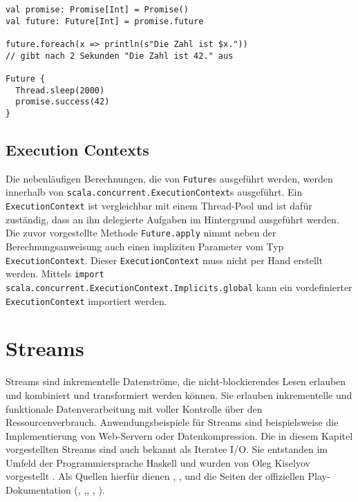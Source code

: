 \begin{lstlisting}[caption=Future-Erstellung mit einem Promise, label=lst:future_erstellung_mit_einem_promise]
val promise: Promise[Int] = Promise()
val future: Future[Int] = promise.future

future.foreach(x => println(s"Die Zahl ist $x."))
// gibt nach 2 Sekunden "Die Zahl ist 42." aus

Future {
  Thread.sleep(2000)
  promise.success(42)
}
\end{lstlisting}


\subsection{Execution Contexts} %
\label{sub:execution_contexts}

Die nebenläufigen Berechnungen, die von \lstinline|Future|s ausgeführt werden, werden innerhalb von \lstinline|scala.concurrent.ExecutionContext|s ausgeführt.
Ein \lstinline|ExecutionContext| ist vergleichbar mit einem Thread-Pool und ist dafür zuständig, dass an ihn delegierte Aufgaben im Hintergrund ausgeführt werden.
Die zuvor vorgestellte Methode \lstinline|Future.apply| nimmt neben der Berechnungsanweisung auch einen impliziten Parameter vom Typ \lstinline|ExecutionContext|.
Dieser \lstinline|ExecutionContext| muss nicht per Hand erstellt werden.
Mittels \lstinline|import scala.concurrent.ExecutionContext.Implicits.global| kann ein vordefinierter \lstinline|ExecutionContext| importiert werden.




\section{Streams} %
\label{sec:streams}

Streams sind inkrementelle Datenströme, die nicht-blockierendes Lesen erlauben und kombiniert und transformiert werden können.
Sie erlauben inkrementelle und funktionale Datenverarbeitung mit voller Kontrolle über den Ressourcenverbrauch.
Anwendungsbeispiele für Streams sind beispielsweise die Implementierung von Web-Servern oder Datenkompression.
Die in diesem Kapitel vorgestellten Streams sind auch bekannt als Iteratee I/O.
Sie entstanden im Umfeld der Programmiersprache Haskell und wurden von Oleg Kiselyov vorgestellt \cite[vgl.][S.~19]{monad_reader}.
Als Quellen hierfür dienen \citealt{kiselyov2012}, \citealt{iteratee_io}, \citealt{monad_reader} und die Seiten der offiziellen Play-Dokumentation (\citealt{iteratees}, \citealt{enumerators},, \citealt{enumeratees}, \citealt{play_api_documentation}).


